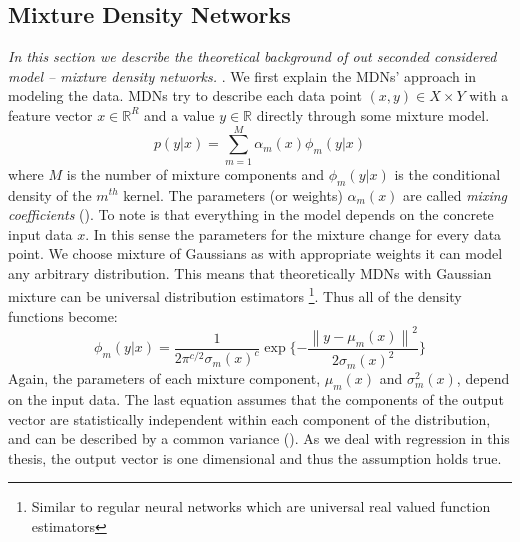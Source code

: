 \documentclass[12pt,a4paper,twoside]{scrartcl}
\numberwithin{equation}{section}
\begin{document}
\subsection{Mixture Density Networks}\label{sec:mdn}
\emph{In this section we describe the theoretical background of out seconded considered model -- mixture density networks. }. We first explain the MDNs' approach in modeling the data. MDNs try to describe each data point \((x,y)\in X\times Y\) with a feature vector \(x\in\mathbb{R}^R\) and a value \(y\in\mathbb{R}\) directly through some mixture model.
\begin{equation}
p(y|x)=\sum_{m=1}^M \alpha_m(x)\phi_m(y|x)
\end{equation}
where \(M\) is the number of mixture components and \(\phi_m(y|x)\) is the conditional density of the \(m^{th}\) kernel. The parameters (or weights) \(\alpha_m(x)\) are called \emph{mixing coefficients} (\cite{bishop1994}). To note is that everything in the model depends on the concrete input data \(x\). In this sense the parameters for the mixture change for every data point. We choose mixture of Gaussians as with appropriate weights it can model any arbitrary distribution. This means that theoretically MDNs with Gaussian mixture can be universal distribution estimators \footnote{Similar to regular neural networks which are universal real valued function estimators}. Thus all of the density functions become:
\begin{equation}
\phi_m(y|x) = \frac{1}{2\pi^{c/2}\sigma_m(x)^c}\exp\{-\frac{\left\lVert y - \mu_m(x) \right\rVert^2}{2\sigma_m(x)^2}\}
\end{equation}
Again, the parameters of each mixture component, \(\mu_m(x)\) and \(\sigma_m^2(x)\), depend on the input data. The last equation assumes that the components of the output vector are statistically independent within each component of the distribution, and can be described by a common variance (\cite{bishop1994}). As we deal with regression in this thesis, the output vector is one dimensional and thus the assumption holds true.
\end{document}
